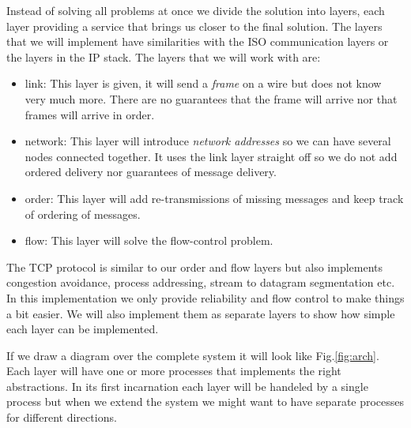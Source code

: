 \documentclass[a4paper,11pt]{article}
\begin{document}
Instead of solving all problems at once we divide the solution into
layers, each layer providing a service that brings us closer to the
final solution. The layers that we will implement have similarities
with the ISO communication layers or the layers in the IP stack. The
layers that we will work with are:

\begin{itemize}

\item link: This layer is given, it will send a {\em frame} on a
  wire but does not know very much more. There are no guarantees that the
  frame will arrive nor that frames will arrive in order.

\item network: This layer will introduce {\em network addresses} so we
  can have several nodes connected together. It uses the link layer
  straight off so we do not add ordered delivery nor guarantees of
  message delivery.

\item order: This layer will add re-transmissions of
  missing messages and keep track of ordering of messages. 
  
\item flow: This layer will solve the flow-control problem.

\end{itemize}

The TCP protocol is similar to our order and flow layers but also
implements congestion avoidance, process addressing, stream to datagram
segmentation etc. In this implementation we only provide reliability
and flow control to make things a bit easier. We will also implement
them as separate layers to show how simple each layer can be
implemented.

If we draw a diagram over the complete system it will look like
Fig.\ref{fig:arch}. Each layer will have one or more processes that
implements the right abstractions. In its first incarnation each layer
will be handeled by a single process but when we extend the system we
might want to have separate processes for different directions.
\end{document}
